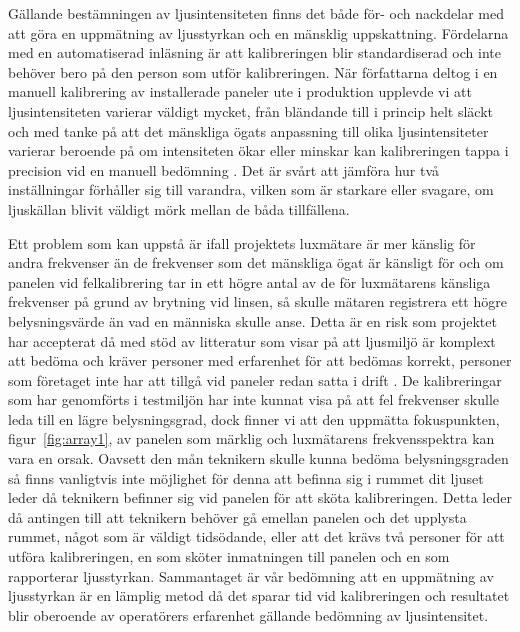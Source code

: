         Gällande bestämningen av ljusintensiteten finns det både för- och nackdelar med att göra en uppmätning av ljusstyrkan och en mänsklig uppskattning. Fördelarna med en automatiserad inläsning är att kalibreringen blir standardiserad och inte behöver bero på den person som utför kalibreringen. När författarna deltog i en manuell kalibrering av installerade paneler ute i produktion upplevde vi att ljusintensiteten varierar väldigt mycket, från bländande till i princip helt släckt och med tanke på att det mänskliga ögats anpassning till olika ljusintensiteter varierar beroende på om intensiteten ökar eller minskar kan kalibreringen tappa i precision vid en manuell bedömning \cite[s.~273]{aot}. Det är svårt att jämföra hur två inställningar förhåller sig till varandra, vilken som är starkare eller svagare, om ljuskällan blivit väldigt mörk mellan de båda tillfällena.\bigskip 

        Ett problem som kan uppstå är ifall projektets luxmätare är mer känslig för andra frekvenser än de frekvenser som det mänskliga ögat är känsligt för och om panelen vid felkalibrering tar in ett högre antal av de för luxmätarens känsliga frekvenser på grund av brytning vid linsen, så skulle mätaren registrera ett högre belysningsvärde än vad en människa skulle anse. Detta är en risk som projektet har accepterat då med stöd av litteratur som visar på att ljusmiljö är komplext att bedöma och kräver personer med erfarenhet för att bedömas korrekt, personer som företaget inte har att tillgå vid paneler redan satta i drift \cite[s.~278]{aot}. De kalibreringar som har genomförts i testmiljön har inte kunnat visa på att fel frekvenser skulle leda till en lägre belysningsgrad, dock finner vi att den uppmätta fokuspunkten, figur~\ref{fig:array1}, av panelen som märklig och luxmätarens frekvensspektra kan vara en orsak. Oavsett den mån teknikern skulle kunna bedöma belysningsgraden så finns vanligtvis inte möjlighet för denna att befinna sig i rummet dit ljuset leder då teknikern befinner sig vid panelen för att sköta kalibreringen. Detta leder då antingen till att teknikern behöver gå emellan panelen och det upplysta rummet, något som är väldigt tidsödande, eller att det krävs två personer för att utföra kalibreringen, en som sköter inmatningen till panelen och en som rapporterar ljusstyrkan. Sammantaget är vår bedömning att en uppmätning av ljusstyrkan är en lämplig metod då det sparar tid vid kalibreringen och resultatet blir oberoende av operatörers erfarenhet gällande bedömning av ljusintensitet. \bigskip

